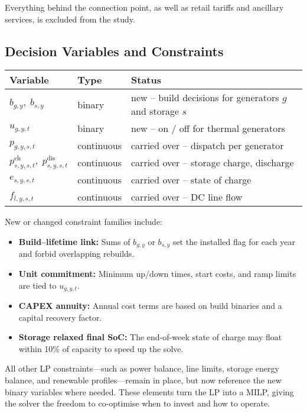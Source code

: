 Everything behind the connection point, as well as retail tariffs and ancillary services, is excluded from the study.

\subsection{Decision Variables and Constraints}

\begin{center}
\begin{tabular}{lll}
\textbf{Variable} & \textbf{Type} & \textbf{Status} \\
\hline
$b_{g,y},\;b_{s,y}$ & binary & new -- build decisions for generators $g$ and storage $s$ \\
$u_{g,y,t}$ & binary & new -- on / off for thermal generators \\
$p_{g,y,s,t}$ & continuous & carried over -- dispatch per generator \\
$p^{\text{ch}}_{s,y,s,t},\;p^{\text{dis}}_{s,y,s,t}$ & continuous & carried over -- storage charge, discharge \\
$e_{s,y,s,t}$ & continuous & carried over -- state of charge \\
$f_{l,y,s,t}$ & continuous & carried over -- DC line flow \\
\end{tabular}
\end{center}

New or changed constraint families include:
\begin{itemize}
    \item \textbf{Build--lifetime link:} Sums of $b_{g,y}$ or $b_{s,y}$ set the installed flag for each year and forbid overlapping rebuilds.
    \item \textbf{Unit commitment:} Minimum up/down times, start costs, and ramp limits are tied to $u_{g,y,t}$.
    \item \textbf{CAPEX annuity:} Annual cost terms are based on build binaries and a capital recovery factor.
    \item \textbf{Storage relaxed final SoC:} The end-of-week state of charge may float within 10\% of capacity to speed up the solve.
\end{itemize}

All other LP constraints—such as power balance, line limits, storage energy balance, and renewable profiles—remain in place, but now reference the new binary variables where needed.
These elements turn the LP into a MILP, giving the solver the freedom to co-optimise when to invest and how to operate.

